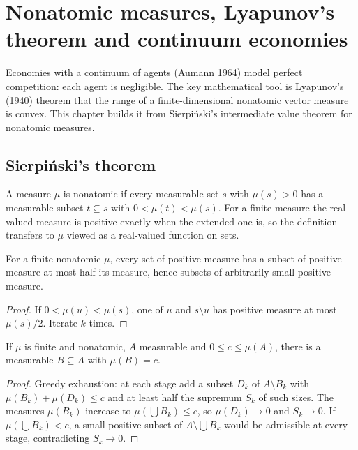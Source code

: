 \chapter{Nonatomic measures, Lyapunov's theorem and continuum economies}
\label{chap:lyapunov}

Economies with a continuum of agents (Aumann 1964) model perfect competition: each agent is negligible. The key
mathematical tool is Lyapunov's (1940) theorem that the range of a finite-dimensional nonatomic vector measure is
convex. This chapter builds it from Sierpiński's intermediate value theorem for nonatomic measures.

\section{Sierpiński's theorem}
\label{sec:sierpinski}

\begin{definition}
\label{def:nonatomic}
\leanok
A measure $\mu$ is nonatomic if every measurable set $s$ with $\mu(s) > 0$ has a measurable
subset $t \subseteq s$ with $0 < \mu(t) < \mu(s)$. For a finite measure the real-valued
measure is positive exactly when the extended one is, so the definition transfers to $\mu$ viewed as
a real-valued function on sets.
\end{definition}

\begin{lemma}
\label{lem:small_subsets}
\leanok
{}
For a finite nonatomic $\mu$, every set of positive measure has a subset of positive measure at most half its measure,
hence subsets of arbitrarily small positive measure.
\end{lemma}
\begin{proof}
\leanok
If $0 < \mu(u) < \mu(s)$, one of $u$ and $s \setminus u$ has positive measure at most $\mu(s)/2$. Iterate $k$ times.
\end{proof}

\begin{theorem}[Sierpiński 1922]
\label{thm:sierpinski}
\leanok
{}
If $\mu$ is finite and nonatomic, $A$ measurable and $0 \le c \le \mu(A)$, there is a measurable $B \subseteq A$ with
$\mu(B) = c$.
\end{theorem}
\begin{proof}
\leanok
Greedy exhaustion: at each stage add a subset $D_k$ of $A \setminus B_k$ with $\mu(B_k) + \mu(D_k) \le c$ and at least half
the supremum $S_k$ of such sizes. The measures $\mu(B_k)$ increase to $\mu(\bigcup B_k) \le c$, so $\mu(D_k) \to 0$ and
$S_k \to 0$. If $\mu(\bigcup B_k) < c$, a small positive subset of $A \setminus \bigcup B_k$ would be admissible at every
stage, contradicting $S_k \to 0$.
\end{proof}

